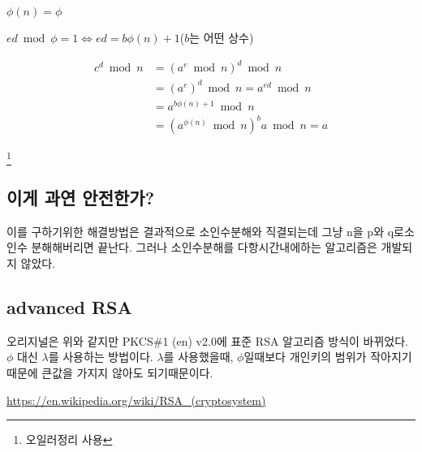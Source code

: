 $ \phi(n) = \phi$

$ ed\bmod \phi =1 \Longleftrightarrow ed = b\phi(n)+1$($b$는 어떤 상수)

\begin{align*}
  c^d \bmod n &=(a^e \bmod n)^d \bmod n \\ 
  &=(a^e)^d \bmod n = a^{ed} \bmod n \\
  &=  a^{b\phi(n)+1}\bmod n  \\
  &= (a^{\phi(n)} \bmod n)^{b} a \bmod n =a  
\end{align*}

\footnote{오일러정리 사용}

\subsection{이게 과연 안전한가?}


이를 구하기위한 해결방법은 결과적으로 소인수분해와 직결되는데 그냥 n을 p와 q로소인수 분해해버리면 끝난다. 그러나 소인수분해를 다항시간내에하는 알고리즘은 개발되지 않았다.



\subsection{advanced RSA}


오리지널은 위와 같지만  PKCS$\#$1 (en) v2.0에 표준 RSA 알고리즘 방식이 바뀌었다.
$\phi$ 대신 $\lambda$를 사용하는 방법이다. $\lambda$를 사용했을때, $\phi$일때보다 개인키의 범위가 작아지기 때문에 큰값을 가지지 않아도 되기때문이다.

\url{https://en.wikipedia.org/wiki/RSA_(cryptosystem)}

